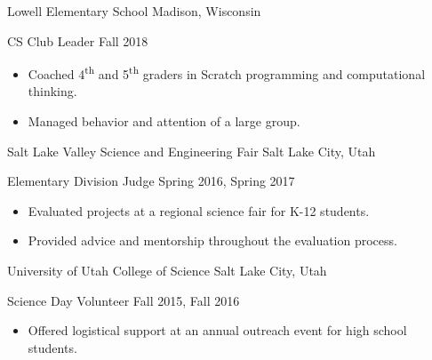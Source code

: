 \blockskip

\begin{tab1} Lowell Elementary School \> Madison, Wisconsin \end{tab1}
\begin{tab2} CS Club Leader \> Fall 2018 \end{tab2}
\begin{itemize}
    \item Coached 4\textsuperscript{th} and 5\textsuperscript{th} graders in Scratch programming and computational thinking.
    \item Managed behavior and attention of a large group.
\end{itemize}

\blockskip

\begin{tab1} Salt Lake Valley Science and Engineering Fair \> Salt Lake City, Utah \end{tab1}
\begin{tab2} Elementary Division Judge \> Spring 2016, Spring 2017 \end{tab2}
\begin{itemize}
    \item Evaluated projects at a regional science fair for K-12 students.
    \item Provided advice and mentorship throughout the evaluation process.
\end{itemize}

\blockskip

\begin{tab1} University of Utah College of Science \> Salt Lake City, Utah \end{tab1}
\begin{tab2} Science Day Volunteer \> Fall 2015, Fall 2016 \end{tab2}
\begin{itemize}
    \item Offered logistical support at an annual outreach event for high school students.
\end{itemize}

